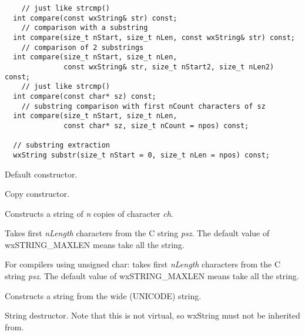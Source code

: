 \begin{verbatim}
    // just like strcmp()
  int compare(const wxString& str) const;
    // comparison with a substring
  int compare(size_t nStart, size_t nLen, const wxString& str) const;
    // comparison of 2 substrings
  int compare(size_t nStart, size_t nLen,
              const wxString& str, size_t nStart2, size_t nLen2) const;
    // just like strcmp()
  int compare(const char* sz) const;
    // substring comparison with first nCount characters of sz
  int compare(size_t nStart, size_t nLen,
              const char* sz, size_t nCount = npos) const;

  // substring extraction
  wxString substr(size_t nStart = 0, size_t nLen = npos) const;
\end{verbatim}


\label{wxstringconstruct}


Default constructor.


Copy constructor.


Constructs a string of {\it n} copies of character {\it ch}.


Takes first {\it nLength} characters from the C string {\it psz}.
The default value of wxSTRING\_MAXLEN means take all the string.


For compilers using unsigned char: takes first {\it nLength} characters from the C string {\it psz}.
The default value of wxSTRING\_MAXLEN means take all the string.


Constructs a string from the wide (UNICODE) string.

\label{wxstringdestruct}


String destructor. Note that this is not virtual, so wxString must not be inherited from.

